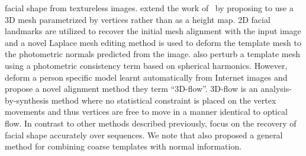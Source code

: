 facial shape from textureless images.
\citet{roth2015unconstrained} extend the work of~\cite{KemelmacherShlizerman:in}
by proposing to use a 3D mesh parametrized by vertices rather than as a height
map. 2D facial landmarks are utilized to recover the initial mesh alignment with
the input image and a novel Laplace mesh editing method is used to deform the
template mesh to the photometric normals predicted from the image.
\citet{Suwajanakorn:2014bl} also perturb a template mesh using a photometric
consistency term based on spherical harmonics.
However, \citet{Suwajanakorn:2014bl} deform a person
specific model learnt automatically from Internet images and propose a novel
alignment method they term ``3D-flow''. 3D-flow is an analysis-by-synthesis
method where no statistical constraint is placed on the vertex movements
and thus vertices are free to move in a manner identical to optical flow. In
contrast to other methods described previously, \citet{Suwajanakorn:2014bl}
focus on the recovery of facial shape accurately over sequences.
We note that \citet{nehab2005efficiently} also proposed a general method
for combining coarse templates with normal information.


